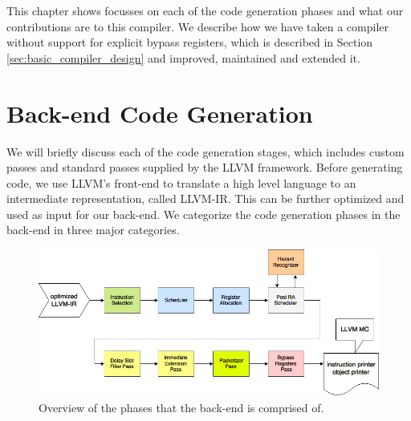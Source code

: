 This chapter shows focusses on each of the code generation phases and what our contributions are to this compiler. We describe how we have taken a compiler without support for explicit bypass registers, which is described in Section \ref{sec:basic_compiler_design} and improved, maintained and extended it. 



\section{Back-end Code Generation}\label{sec:code_generation}
We will briefly discuss each of the code generation stages, which includes custom passes and standard passes supplied by the LLVM framework. Before generating code, we use LLVM's front-end to translate a high level language to an intermediate representation, called LLVM-IR. This can be further optimized and used as input for our back-end. We categorize the code generation phases in the back-end in three major categories.

\begin{figure}[H]
\centering
\hspace*{-.12in}
\includegraphics[scale=0.53]{figures/code_generation}
\caption{Overview of the phases that the back-end is comprised of.}
\label{fig:simd_backend}
\end{figure}


